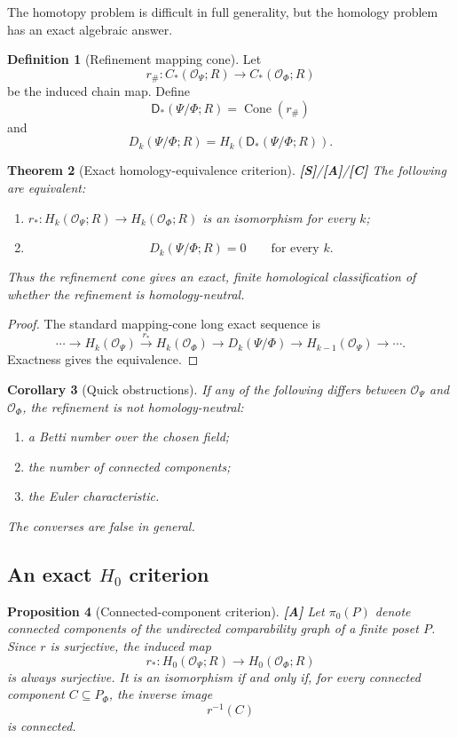 \documentclass[11pt]{article}
\newtheorem{theorem}{Theorem}[section]
\newtheorem{proposition}[theorem]{Proposition}
\newtheorem{corollary}[theorem]{Corollary}
\theoremstyle{definition}
\newtheorem{definition}[theorem]{Definition}
\newcommand{\OX}{\mathcal O}
\newcommand{\Cone}{\operatorname{Cone}}
\newcommand{\statusS}{\textbf{[S]}}
\newcommand{\statusA}{\textbf{[A]}}
\newcommand{\statusC}{\textbf{[C]}}
\begin{document}
The homotopy problem is difficult in full generality, but the homology problem has an exact algebraic answer.

\begin{definition}[Refinement mapping cone]
Let
\[
r_\#:C_*(\OX_\Psi;R)\longrightarrow C_*(\OX_\Phi;R)
\]
be the induced chain map. Define
\[
\mathsf D_*(\Psi/\Phi;R)=\Cone(r_\#)
\]
and
\[
D_k(\Psi/\Phi;R)=H_k(\mathsf D_*(\Psi/\Phi;R)).
\]
\end{definition}

\begin{theorem}[Exact homology-equivalence criterion]\label{thm:coneexact}
\statusS/\statusA/\statusC\;
The following are equivalent:
\begin{enumerate}[label=(\roman*)]
\item \(r_*:H_k(\OX_\Psi;R)\to H_k(\OX_\Phi;R)\) is an isomorphism for every \(k\);
\item
\[
D_k(\Psi/\Phi;R)=0
\qquad\text{for every }k.
\]
\end{enumerate}
Thus the refinement cone gives an exact, finite homological classification of whether the refinement is homology-neutral.
\end{theorem}

\begin{proof}
The standard mapping-cone long exact sequence is
\[
\cdots\to H_k(\OX_\Psi)
\overset{r_*}{\longrightarrow}H_k(\OX_\Phi)
\to D_k(\Psi/\Phi)
\to H_{k-1}(\OX_\Psi)\to\cdots.
\]
Exactness gives the equivalence.
\end{proof}

\begin{corollary}[Quick obstructions]
If any of the following differs between \(\OX_\Psi\) and \(\OX_\Phi\), the refinement is not homology-neutral:
\begin{enumerate}[label=(\alph*)]
\item a Betti number over the chosen field;
\item the number of connected components;
\item the Euler characteristic.
\end{enumerate}
The converses are false in general.
\end{corollary}

\subsection{An exact \(H_0\) criterion}

\begin{proposition}[Connected-component criterion]\label{prop:H0}
\statusA\;
Let \(\pi_0(P)\) denote connected components of the undirected comparability graph of a finite poset \(P\). Since \(r\) is surjective, the induced map
\[
r_*:H_0(\OX_\Psi;R)\to H_0(\OX_\Phi;R)
\]
is always surjective. It is an isomorphism if and only if, for every connected component \(C\subseteq P_\Phi\), the inverse image
\[
r^{-1}(C)
\]
is connected.
\end{proposition}
\end{document}
